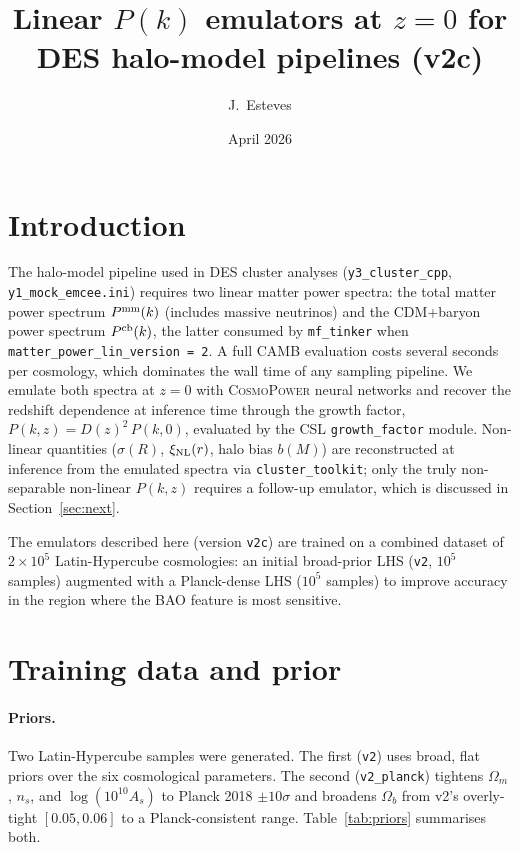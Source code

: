 \documentclass[11pt]{article}
\title{Linear $P(k)$ emulators at $z=0$ for DES halo-model pipelines (v2c)}
\author{J.\ Esteves}
\date{April 2026}
\begin{document}
\maketitle

\section{Introduction}

The halo-model pipeline used in DES cluster analyses
(\texttt{y3\_cluster\_cpp}, \texttt{y1\_mock\_emcee.ini}) requires two
linear matter power spectra: the total matter power spectrum
$P^{\rm mm}(k)$ (includes massive neutrinos) and the CDM+baryon power
spectrum $P^{\rm cb}(k)$, the latter consumed by \texttt{mf\_tinker}
when \texttt{matter\_power\_lin\_version = 2}. A full CAMB evaluation
costs several seconds per cosmology, which dominates the wall time of
any sampling pipeline. We emulate both spectra at $z=0$ with
\textsc{CosmoPower} neural networks and recover the redshift
dependence at inference time through the growth factor,
$P(k, z) = D(z)^2 \, P(k, 0)$, evaluated by the CSL
\texttt{growth\_factor} module. Non-linear quantities ($\sigma(R)$,
$\xi_{\rm NL}(r)$, halo bias $b(M)$) are reconstructed at inference
from the emulated spectra via \texttt{cluster\_toolkit}; only the
truly non-separable non-linear $P(k, z)$ requires a follow-up
emulator, which is discussed in Section~\ref{sec:next}.

The emulators described here (version \texttt{v2c}) are trained on a
combined dataset of $2 \times 10^5$ Latin-Hypercube cosmologies: an
initial broad-prior LHS (\texttt{v2}, $10^5$ samples) augmented with
a Planck-dense LHS ($10^5$ samples) to improve accuracy in the region
where the BAO feature is most sensitive.

\section{Training data and prior}
\label{sec:data}

\paragraph{Priors.} Two Latin-Hypercube samples were generated. The
first (\texttt{v2}) uses broad, flat priors over the six cosmological
parameters. The second (\texttt{v2\_planck}) tightens $\Omega_m$,
$n_s$, and $\log(10^{10} A_s)$ to Planck 2018 $\pm 10\sigma$ and
broadens $\Omega_b$ from v2's overly-tight $[0.05,0.06]$ to a
Planck-consistent range. Table~\ref{tab:priors} summarises both.
\end{document}
